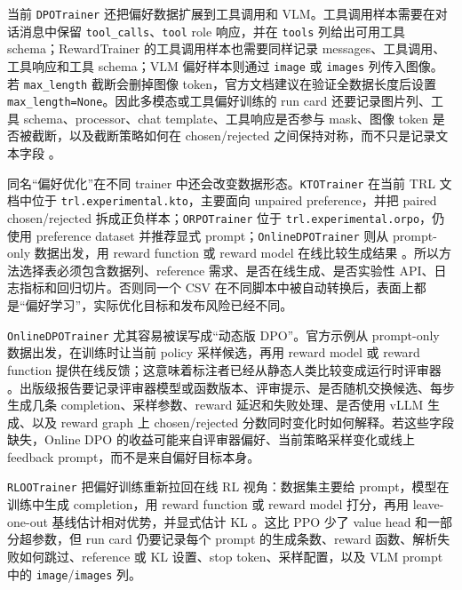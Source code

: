 \documentclass[UTF8,zihao=-4,openany]{ctexbook}
\begin{document}
当前 \texttt{DPOTrainer} 还把偏好数据扩展到工具调用和 VLM。工具调用样本需要在对话消息中保留 \texttt{tool\_calls}、\texttt{tool} role 响应，并在 \texttt{tools} 列给出可用工具 schema；RewardTrainer 的工具调用样本也需要同样记录 messages、工具调用、工具响应和工具 schema；VLM 偏好样本则通过 \texttt{image} 或 \texttt{images} 列传入图像。若 \texttt{max\_length} 截断会删掉图像 token，官方文档建议在验证全数据长度后设置 \texttt{max\_length=None}。因此多模态或工具偏好训练的 run card 还要记录图片列、工具 schema、processor、chat template、工具响应是否参与 mask、图像 token 是否被截断，以及截断策略如何在 chosen/rejected 之间保持对称，而不只是记录文本字段 \cite{huggingface2026trldpotrainer,huggingface2026trlrewardtrainer}。

同名“偏好优化”在不同 trainer 中还会改变数据形态。\texttt{KTOTrainer} 在当前 TRL 文档中位于 \texttt{trl.experimental.kto}，主要面向 unpaired preference，并把 paired chosen/rejected 拆成正负样本；\texttt{ORPOTrainer} 位于 \texttt{trl.experimental.orpo}，仍使用 preference dataset 并推荐显式 prompt；\texttt{OnlineDPOTrainer} 则从 prompt-only 数据出发，用 reward function 或 reward model 在线比较生成结果 \cite{huggingface2026trlktotrainer,huggingface2026trlorpotrainer,huggingface2026trlonlinedpotrainer}。所以方法选择表必须包含数据列、reference 需求、是否在线生成、是否实验性 API、日志指标和回归切片。否则同一个 CSV 在不同脚本中被自动转换后，表面上都是“偏好学习”，实际优化目标和发布风险已经不同。

\texttt{OnlineDPOTrainer} 尤其容易被误写成“动态版 DPO”。官方示例从 prompt-only 数据出发，在训练时让当前 policy 采样候选，再用 reward model 或 reward function 提供在线反馈；这意味着标注者已经从静态人类比较变成运行时评审器 \cite{huggingface2026trlonlinedpotrainer}。出版级报告要记录评审器模型或函数版本、评审提示、是否随机交换候选、每步生成几条 completion、采样参数、reward 延迟和失败处理、是否使用 vLLM 生成、以及 reward graph 上 chosen/rejected 分数同时变化时如何解释。若这些字段缺失，Online DPO 的收益可能来自评审器偏好、当前策略采样变化或线上 feedback prompt，而不是来自偏好目标本身。

\texttt{RLOOTrainer} 把偏好训练重新拉回在线 RL 视角：数据集主要给 prompt，模型在训练中生成 completion，用 reward function 或 reward model 打分，再用 leave-one-out 基线估计相对优势，并显式估计 KL \cite{huggingface2026trlrlootrainer,huggingface2026trlrewards}。这比 PPO 少了 value head 和一部分超参数，但 run card 仍要记录每个 prompt 的生成条数、reward 函数、解析失败如何跳过、reference 或 KL 设置、stop token、采样配置，以及 VLM prompt 中的 \texttt{image}/\texttt{images} 列。
\end{document}
